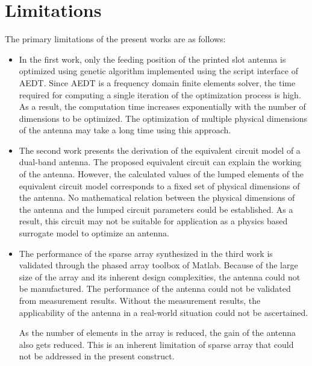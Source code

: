 \section{Limitations}\label{c6sec_limitations}
The primary limitations of the present works are as follows:
\begin{itemize}
\item In the first work, only the feeding position of the printed slot antenna is optimized using genetic algorithm implemented using the script interface of AEDT. Since AEDT is a frequency domain finite elements solver, the time required for computing a single iteration of the optimization process is high. As a result, the computation time increases exponentially with the number of dimensions to be optimized. The optimization of multiple physical dimensions of the antenna may take a long time using this approach.
\item The second work presents the derivation of the equivalent circuit model of a dual-band antenna. The proposed equivalent circuit can explain the working of the antenna. However, the calculated values of the lumped elements of the equivalent circuit model corresponds to a fixed set of physical dimensions of the antenna. No mathematical relation between the physical dimensions of the antenna and the lumped circuit parameters could be established. As a result, this circuit may not be suitable for application as a physics based surrogate model to optimize an antenna.
\item The performance of the sparse array synthesized in the third work is validated through the phased array toolbox of Matlab. Because of the large size of the array and its inherent design complexities, the antenna could not be manufactured. The performance of the antenna could not be validated from measurement results. Without the measurement results, the applicability of the antenna in a real-world situation could not be ascertained.

    As the number of elements in the array is reduced, the gain of the antenna also gets reduced. This is an inherent limitation of sparse array that could not be addressed in the present construct.
\end{itemize}

